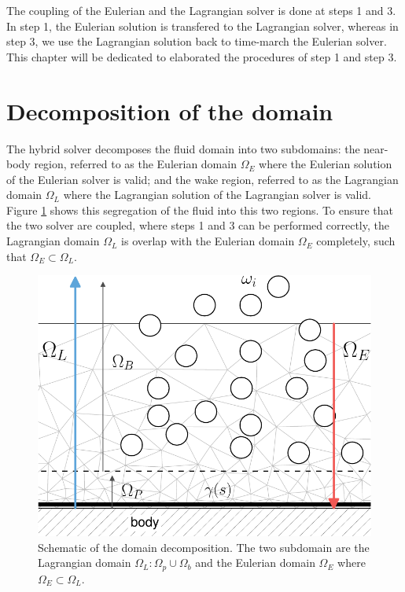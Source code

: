 
The coupling of the Eulerian and the Lagrangian solver is done at steps 1 and 3. In step 1, the Eulerian solution is transfered to the Lagrangian solver, whereas in step 3, we use the Lagrangian solution back to time-march the Eulerian solver. This chapter will be dedicated to elaborated the procedures of step 1 and step 3.

\section{Decomposition of the domain}
\label{sec:dotd}
The hybrid solver decomposes the fluid domain into two subdomains: the near-body region, referred to as the Eulerian domain $\Omega_E$ where the Eulerian solution of the Eulerian solver is valid; and the wake region, referred to as the Lagrangian domain $\Omega_L$ where the Lagrangian solution of the Lagrangian solver is valid. Figure \ref{fig:hybrid_domains} shows this segregation of the fluid into this two regions. To ensure that the two solver are coupled, where steps 1 and 3 can be performed correctly, the Lagrangian domain $\Omega_L$ is overlap with the Eulerian domain $\Omega_E$ completely, such that $\Omega_E \subset \Omega_L$. 
	\begin{figure}[h]
	\centering
	\includegraphics[width=0.45\linewidth]{./figures/hybrid/interpolation/hybrid_domains-crop.pdf}
	\caption{Schematic of the domain decomposition. The two subdomain are the Lagrangian domain $\Omega_L: \Omega_p \cup \Omega_b$ and the Eulerian domain $\Omega_E$ where $\Omega_E \subset \Omega_L$.}
	\label{fig:hybrid_domains}
	\end{figure}

